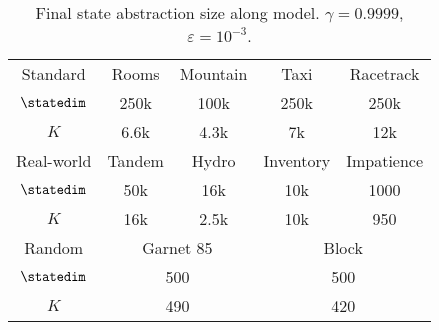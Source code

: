 \begin{table}[h]
    \centering
    \begin{tabular}{c|cccc}
        Standard    & Rooms                         & Mountain                  & Taxi      & Racetrack  \\
        $\statedim$ & 250k                          & 100k                      & 250k      & 250k       \\
        $K$         & 6.6k                          & 4.3k                      & 7k        & 12k        \\ \toprule
        Real-world  & Tandem                        & Hydro                     & Inventory & Impatience \\
        $\statedim$ & 50k                           & 16k                       & 10k       & 1000       \\
        $K$         & 16k                           & 2.5k                      & 10k       & 950        \\ \toprule
        Random      & \multicolumn{2}{c}{Garnet 85} & \multicolumn{2}{c}{Block}                          \\
        $\statedim$ & \multicolumn{2}{c}{500}       & \multicolumn{2}{c}{500}                            \\
        $K$         & \multicolumn{2}{c}{490}       & \multicolumn{2}{c}{420}
    \end{tabular}
    \caption{Final state abstraction size along model. $\gamma= 0.9999$, $\varepsilon = 10^{-3}$.}
\end{table}\label{tab:abs_size}